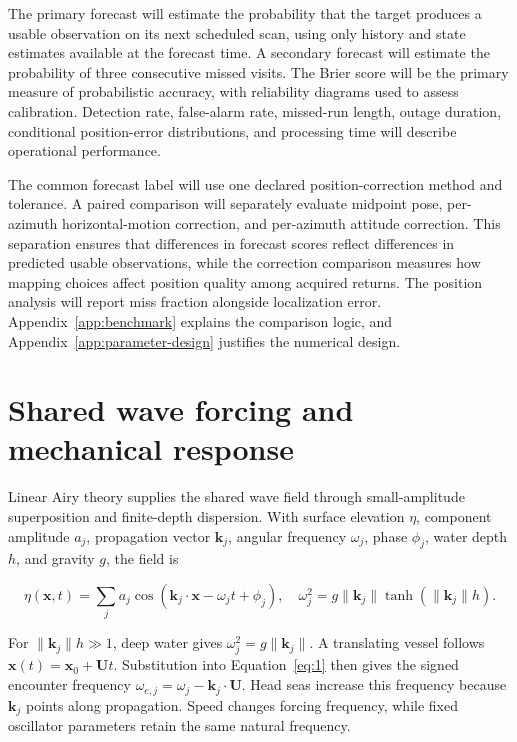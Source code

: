 \documentclass[10pt,letterpaper]{article}
\begin{document}
The primary forecast will estimate the probability that the target produces a usable observation on its next scheduled scan, using only history and state estimates available at the forecast time. A secondary forecast will estimate the probability of three consecutive missed visits. The Brier score will be the primary measure of probabilistic accuracy, with reliability diagrams used to assess calibration. Detection rate, false-alarm rate, missed-run length, outage duration, conditional position-error distributions, and processing time will describe operational performance.

The common forecast label will use one declared position-correction method and tolerance. A paired comparison will separately evaluate midpoint pose, per-azimuth horizontal-motion correction, and per-azimuth attitude correction. This separation ensures that differences in forecast scores reflect differences in predicted usable observations, while the correction comparison measures how mapping choices affect position quality among acquired returns. The position analysis will report miss fraction alongside localization error. Appendix~\ref{app:benchmark} explains the comparison logic, and Appendix~\ref{app:parameter-design} justifies the numerical design.


\clearpage

\appendix

\clearpage

\section{Shared wave forcing and mechanical response}

\label{app:forcing}

Linear Airy theory supplies the shared wave field through small-amplitude superposition and finite-depth dispersion. \cite[Sec.~6.2, pp.~3--6]{MITOCW2005LinearWaves} With surface elevation $\eta$, component amplitude $a_j$, propagation vector $\mathbf{k}_j$, angular frequency $\omega_j$, phase $\phi_j$, water depth $h$, and gravity $g$, the field is

\begin{equation}
\label{eq:1}
\eta(\mathbf{x},t)=\sum_j a_j\cos(\mathbf{k}_j\cdot\mathbf{x}-\omega_j t+\phi_j),\quad\omega_j^2=g\lVert\mathbf{k}_j\rVert\tanh(\lVert\mathbf{k}_j\rVert h).
\end{equation}

For $\lVert\mathbf{k}_j\rVert h\gg1$, deep water gives $\omega_j^2=g\lVert\mathbf{k}_j\rVert$. A translating vessel follows $\mathbf{x}(t)=\mathbf{x}_0+\mathbf{U}t$. \cite[pp.~1--2]{Sclavounos2002TranslatingCoordinates} Substitution into Equation~\ref{eq:1} then gives the signed encounter frequency $\omega_{e,j}=\omega_j-\mathbf{k}_j\cdot\mathbf{U}$. Head seas increase this frequency because $\mathbf{k}_j$ points along propagation. Speed changes forcing frequency, while fixed oscillator parameters retain the same natural frequency.
\end{document}
